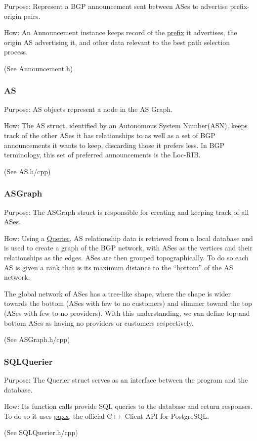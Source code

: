 \documentclass[letterpaper]{article}
\begin{document}
Purpose: Represent a BGP announcement sent between ASes to advertise
prefix-origin pairs.

How: An Announcement instance keeps record of the
\protect\hyperlink{Prefix}{prefix} it advertises, the origin AS
advertising it, and other data relevant to the best path selection
process.

(See Announcement.h)

\hypertarget{as}{%
\subsubsection{AS}\label{as}}

Purpose: AS objects represent a node in the AS Graph.

How: The AS struct, identified by an Autonomous System Number(ASN),
keeps track of the other ASes it has relationships to as well as a set
of BGP announcements it wants to keep, discarding those it prefers less.
In BGP terminology, this set of preferred announcements is the Loc-RIB.

(See AS.h/cpp)

\hypertarget{asgraph}{%
\subsubsection{ASGraph}\label{asgraph}}

Purpose: The ASGraph struct is responsible for creating and keeping
track of all \protect\hyperlink{AS}{ASes}.

How: Using a \protect\hyperlink{Querier}{Querier}, AS relationship data
is retrieved from a local database and is used to create a graph of the
BGP network, with ASes as the vertices and their relationships as the
edges. ASes are then grouped topographically. To do so each AS is given
a rank that is its maximum distance to the ``bottom'' of the AS network.

The global network of ASes has a tree-like shape, where the shape is
wider towards the bottom (ASes with few to no customers) and slimmer
toward the top (ASes with few to no providers). With this understanding,
we can define top and bottom ASes as having no providers or customers
respectively.

(See ASGraph.h/cpp)

\hypertarget{sqlquerier}{%
\subsubsection{SQLQuerier}\label{sqlquerier}}

Purpose: The Querier struct serves as an interface between the program
and the database.

How: Its function calls provide SQL queries to the database and return
responses. To do so it uses \href{https://github.com/jtv/libpqxx}{pqxx},
the official C++ Client API for PostgreSQL.

(See SQLQuerier.h/cpp)
\end{document}
